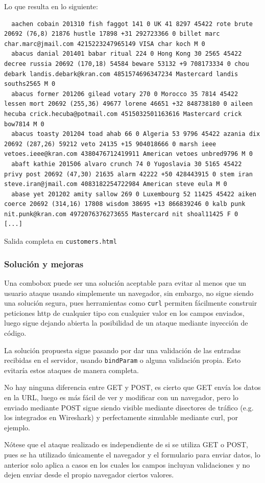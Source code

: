 \documentclass{article}
\begin{document}
Lo que resulta en lo siguiente:
\begin{lstlisting}
  aachen cobain 201310 fish faggot 141 0 UK 41 8297 45422 rote brute 20692 (76,8) 21876 hustle 17898 +31 292723366 0 billet marc char.marc@jmail.com 4215223247965149 VISA char koch M 0
  abacus danial 201401 babar ritual 224 0 Hong Kong 30 2565 45422 decree russia 20692 (170,18) 54584 beware 53132 +9 708173334 0 chou debark landis.debark@kran.com 4851574696347234 Mastercard landis souths2565 M 0
  abacus former 201206 gilead votary 270 0 Morocco 35 7814 45422 lessen mort 20692 (255,36) 49677 lorene 46651 +32 848738180 0 aileen hecuba crick.hecuba@potmail.com 4515032501163616 Mastercard crick bow7814 M 0
  abacus toasty 201204 toad ahab 66 0 Algeria 53 9796 45422 azania dix 20692 (287,26) 59212 veto 24135 +15 904018666 0 marsh ieee vetoes.ieee@kran.com 4380476712419911 American vetoes unbred9796 M 0
  abaft kathie 201506 alvaro crunch 74 0 Yugoslavia 30 5165 45422 privy post 20692 (47,30) 21635 alarm 42222 +50 428443915 0 stem iran steve.iran@jmail.com 4083182254722984 American steve eula M 0
  abase yet 201202 amity sallow 269 0 Luxembourg 52 11425 45422 aiken coerce 20692 (314,16) 17808 wisdom 38695 +13 866839246 0 kalb punk nit.punk@kran.com 4972076376273655 Mastercard nit shoal11425 F 0
[...]
\end{lstlisting}
{\footnotesize Salida completa en \texttt{customers.html}}

\subsubsection{Solución y mejoras}

Una combobox puede ser una solución aceptable para evitar al menos que un usuario ataque usando simplemente un navegador, sin embargo, no sigue siendo una solución segura, pues herramientas como \texttt{curl} permiten fácilmente construir peticiones http de cualquier tipo con cualquier valor en los campos enviados, luego sigue dejando abierta la posibilidad de un ataque mediante inyección de código.

La solución propuesta sigue pasando por dar una validación de las entradas recibidas en el servidor, usando \texttt{bindParam} o alguna validación propia. Esto evitaría estos ataques de manera completa.

No hay ninguna diferencia entre GET y POST, es cierto que GET envía los datos en la URL, luego es más fácil de ver y modificar con un navegador, pero lo enviado mediante POST sigue siendo visible mediante disectores de tráfico (e.g. los integrados en Wireshark) y perfectamente simulable mediante curl, por ejemplo.

Nótese que el ataque realizado es independiente de si se utiliza GET o POST, pues se ha utilizado únicamente el navegador y el formulario para enviar datos, lo anterior solo aplica a casos en los cuales los campos incluyan validaciones y no dejen enviar desde el propio navegador ciertos valores.
\end{document}
